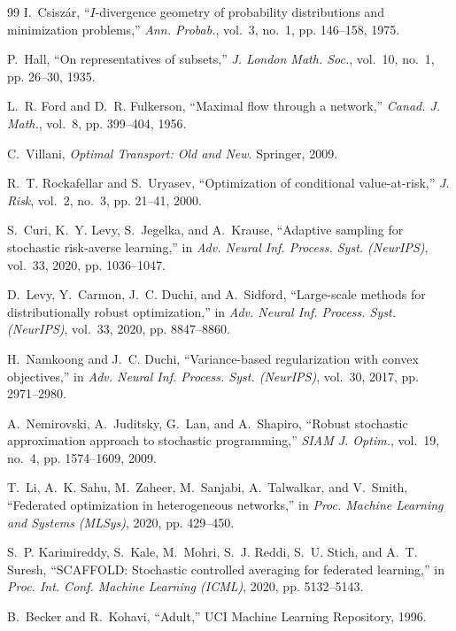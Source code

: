 \documentclass{article}
\theoremstyle{definition}
\begin{document}
\begin{thebibliography}{99}
I.~Csisz\'{a}r, ``$I$-divergence geometry of probability distributions and
minimization problems,'' \emph{Ann. Probab.}, vol.~3, no.~1, pp. 146--158, 1975.

P.~Hall, ``On representatives of subsets,'' \emph{J. London Math. Soc.},
vol.~10, no.~1, pp. 26--30, 1935.

L.~R. Ford and D.~R. Fulkerson, ``Maximal flow through a network,'' \emph{Canad.
J. Math.}, vol.~8, pp. 399--404, 1956.

C.~Villani, \emph{Optimal Transport: Old and New}. Springer, 2009.

R.~T. Rockafellar and S.~Uryasev, ``Optimization of conditional value-at-risk,''
\emph{J. Risk}, vol.~2, no.~3, pp. 21--41, 2000.

S.~Curi, K.~Y. Levy, S.~Jegelka, and A.~Krause, ``Adaptive sampling for
stochastic risk-averse learning,'' in \emph{Adv. Neural Inf. Process. Syst.
(NeurIPS)}, vol.~33, 2020, pp. 1036--1047.

D.~Levy, Y.~Carmon, J.~C. Duchi, and A.~Sidford, ``Large-scale methods for
distributionally robust optimization,'' in \emph{Adv. Neural Inf. Process.
Syst. (NeurIPS)}, vol.~33, 2020, pp. 8847--8860.

H.~Namkoong and J.~C. Duchi, ``Variance-based regularization with convex
objectives,'' in \emph{Adv. Neural Inf. Process. Syst. (NeurIPS)}, vol.~30,
2017, pp. 2971--2980.

A.~Nemirovski, A.~Juditsky, G.~Lan, and A.~Shapiro, ``Robust stochastic
approximation approach to stochastic programming,'' \emph{SIAM J. Optim.},
vol.~19, no.~4, pp. 1574--1609, 2009.

T.~Li, A.~K. Sahu, M.~Zaheer, M.~Sanjabi, A.~Talwalkar, and V.~Smith,
``Federated optimization in heterogeneous networks,'' in \emph{Proc. Machine
Learning and Systems (MLSys)}, 2020, pp. 429--450.

S.~P. Karimireddy, S.~Kale, M.~Mohri, S.~J. Reddi, S.~U. Stich, and A.~T.
Suresh, ``SCAFFOLD: Stochastic controlled averaging for federated learning,''
in \emph{Proc. Int. Conf. Machine Learning (ICML)}, 2020, pp. 5132--5143.

B.~Becker and R.~Kohavi, ``Adult,'' UCI Machine Learning Repository, 1996.


\end{thebibliography}
\end{document}
